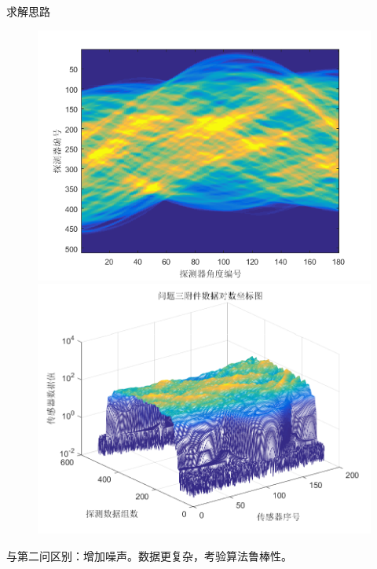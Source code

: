 \documentclass{beamer}
\begin{document}
\begin{frame}{求解思路}
   \begin{figure}[H]
		\begin{minipage}[H]{0.45\textwidth}
		\centering
		\includegraphics[width=\textwidth]{./pic/fujian5_2.png}
		\end{minipage}
		\begin{minipage}[H]{0.5\textwidth}
		\centering
		\includegraphics[width=\textwidth]{./pic/fujian5.png}
		\end{minipage}
	\end{figure}
	与第二问区别：增加噪声。数据更复杂，考验算法鲁棒性。
\end{frame}
  
\end{document}
